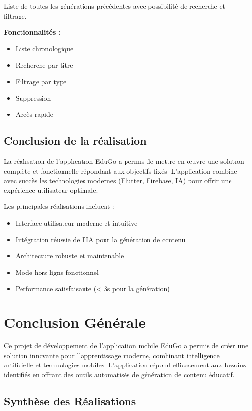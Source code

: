 \documentclass[12pt,a4paper]{report}
\begin{document}
Liste de toutes les générations précédentes avec possibilité de recherche et filtrage.

\textbf{Fonctionnalités :}
\begin{itemize}
    \item Liste chronologique
    \item Recherche par titre
    \item Filtrage par type
    \item Suppression
    \item Accès rapide
\end{itemize}

\section{Conclusion de la réalisation}

La réalisation de l'application EduGo a permis de mettre en œuvre une solution complète et fonctionnelle répondant aux objectifs fixés. L'application combine avec succès les technologies modernes (Flutter, Firebase, IA) pour offrir une expérience utilisateur optimale.

Les principales réalisations incluent :
\begin{itemize}
    \item Interface utilisateur moderne et intuitive
    \item Intégration réussie de l'IA pour la génération de contenu
    \item Architecture robuste et maintenable
    \item Mode hors ligne fonctionnel
    \item Performance satisfaisante (< 3s pour la génération)
\end{itemize}

\chapter{Conclusion Générale}

Ce projet de développement de l'application mobile EduGo a permis de créer une solution innovante pour l'apprentissage moderne, combinant intelligence artificielle et technologies mobiles. L'application répond efficacement aux besoins identifiés en offrant des outils automatisés de génération de contenu éducatif.

\section*{Synthèse des Réalisations}
\end{document}
